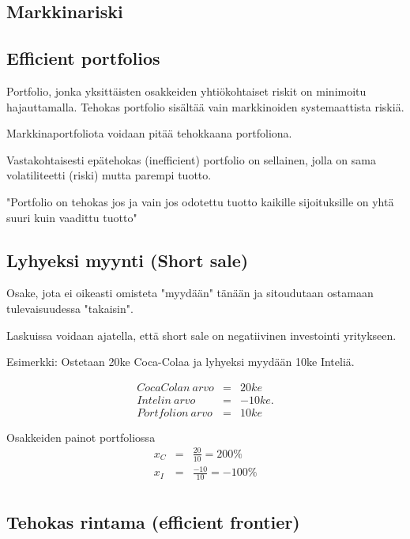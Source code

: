 \documentclass[a4paper]{article}
\begin{document}
\subsection{Markkinariski}

\subsection{Efficient portfolios}

Portfolio, jonka yksittäisten osakkeiden yhtiökohtaiset riskit on minimoitu hajauttamalla. Tehokas portfolio sisältää vain markkinoiden systemaattista riskiä.

Markkinaportfoliota voidaan pitää tehokkaana portfoliona.

Vastakohtaisesti epätehokas (inefficient) portfolio on sellainen, jolla on sama volatiliteetti (riski) mutta parempi tuotto.

"Portfolio on tehokas jos ja vain jos odotettu tuotto kaikille sijoituksille on yhtä suuri kuin vaadittu tuotto"

\subsection{Lyhyeksi myynti (Short sale)}

Osake, jota ei oikeasti omisteta "myydään" tänään ja sitoudutaan ostamaan tulevaisuudessa "takaisin".

Laskuissa voidaan ajatella, että short sale on negatiivinen investointi yritykseen.

Esimerkki: Ostetaan 20ke Coca-Colaa ja lyhyeksi myydään 10ke Inteliä. 

\[
\begin{array}{lcl}
    CocaColan\ arvo & = & 20ke \\
    Intelin\ arvo & = & -10ke. \\
    Portfolion\ arvo & = & 10ke
\end{array}
\]

Osakkeiden painot portfoliossa
\[
\begin{array}{lcl}
    x_C & = & \frac{20}{10} = 200\% \\
    x_I & = & \frac{-10}{10} = -100\% \\
\end{array}
\]

\subsection{Tehokas rintama (efficient frontier)}
\end{document}
